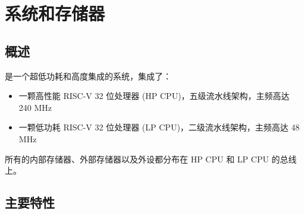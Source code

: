 \documentclass[main\_\_CN.tex]{subfiles}
\begin{document}

\ifglobal
\else
    \listoftodos
    {\let\clearpage\relax \listofdonetodos}
    \tableofcontents
\fi



\hypertarget{sysmem}{}
\chapter{系统和存储器}
\label{mod:sysmem}

\section{概述}

\chipname{} 是一个超低功耗和高度集成的系统，集成了：
\begin{itemize}
    \item 一颗高性能 RISC-V 32 位处理器 (HP CPU)，五级流水线架构，主频高达 240 MHz
    \item 一颗低功耗 RISC-V 32 位处理器 (LP CPU)，二级流水线架构，主频高达 48 MHz
\end{itemize}

所有的内部存储器、外部存储器以及外设都分布在 HP CPU 和 LP CPU 的总线上。

\section{主要特性}
\end{document}
